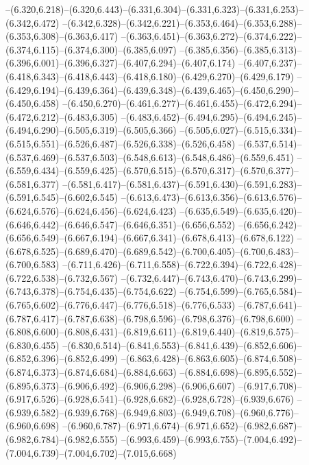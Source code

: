   --(6.320,6.218)--(6.320,6.443)--(6.331,6.304)--(6.331,6.323)--(6.331,6.253)--(6.342,6.472)%
  --(6.342,6.328)--(6.342,6.221)--(6.353,6.464)--(6.353,6.288)--(6.353,6.308)--(6.363,6.417)%
  --(6.363,6.451)--(6.363,6.272)--(6.374,6.222)--(6.374,6.115)--(6.374,6.300)--(6.385,6.097)%
  --(6.385,6.356)--(6.385,6.313)--(6.396,6.001)--(6.396,6.327)--(6.407,6.294)--(6.407,6.174)%
  --(6.407,6.237)--(6.418,6.343)--(6.418,6.443)--(6.418,6.180)--(6.429,6.270)--(6.429,6.179)%
  --(6.429,6.194)--(6.439,6.364)--(6.439,6.348)--(6.439,6.465)--(6.450,6.290)--(6.450,6.458)%
  --(6.450,6.270)--(6.461,6.277)--(6.461,6.455)--(6.472,6.294)--(6.472,6.212)--(6.483,6.305)%
  --(6.483,6.452)--(6.494,6.295)--(6.494,6.245)--(6.494,6.290)--(6.505,6.319)--(6.505,6.366)%
  --(6.505,6.027)--(6.515,6.334)--(6.515,6.551)--(6.526,6.487)--(6.526,6.338)--(6.526,6.458)%
  --(6.537,6.514)--(6.537,6.469)--(6.537,6.503)--(6.548,6.613)--(6.548,6.486)--(6.559,6.451)%
  --(6.559,6.434)--(6.559,6.425)--(6.570,6.515)--(6.570,6.317)--(6.570,6.377)--(6.581,6.377)%
  --(6.581,6.417)--(6.581,6.437)--(6.591,6.430)--(6.591,6.283)--(6.591,6.545)--(6.602,6.545)%
  --(6.613,6.473)--(6.613,6.356)--(6.613,6.576)--(6.624,6.576)--(6.624,6.456)--(6.624,6.423)%
  --(6.635,6.549)--(6.635,6.420)--(6.646,6.442)--(6.646,6.547)--(6.646,6.351)--(6.656,6.552)%
  --(6.656,6.242)--(6.656,6.549)--(6.667,6.194)--(6.667,6.341)--(6.678,6.413)--(6.678,6.122)%
  --(6.678,6.525)--(6.689,6.470)--(6.689,6.542)--(6.700,6.405)--(6.700,6.483)--(6.700,6.583)%
  --(6.711,6.426)--(6.711,6.558)--(6.722,6.394)--(6.722,6.428)--(6.722,6.538)--(6.732,6.567)%
  --(6.732,6.447)--(6.743,6.470)--(6.743,6.299)--(6.743,6.378)--(6.754,6.435)--(6.754,6.622)%
  --(6.754,6.599)--(6.765,6.584)--(6.765,6.602)--(6.776,6.447)--(6.776,6.518)--(6.776,6.533)%
  --(6.787,6.641)--(6.787,6.417)--(6.787,6.638)--(6.798,6.596)--(6.798,6.376)--(6.798,6.600)%
  --(6.808,6.600)--(6.808,6.431)--(6.819,6.611)--(6.819,6.440)--(6.819,6.575)--(6.830,6.455)%
  --(6.830,6.514)--(6.841,6.553)--(6.841,6.439)--(6.852,6.606)--(6.852,6.396)--(6.852,6.499)%
  --(6.863,6.428)--(6.863,6.605)--(6.874,6.508)--(6.874,6.373)--(6.874,6.684)--(6.884,6.663)%
  --(6.884,6.698)--(6.895,6.552)--(6.895,6.373)--(6.906,6.492)--(6.906,6.298)--(6.906,6.607)%
  --(6.917,6.708)--(6.917,6.526)--(6.928,6.541)--(6.928,6.682)--(6.928,6.728)--(6.939,6.676)%
  --(6.939,6.582)--(6.939,6.768)--(6.949,6.803)--(6.949,6.708)--(6.960,6.776)--(6.960,6.698)%
  --(6.960,6.787)--(6.971,6.674)--(6.971,6.652)--(6.982,6.687)--(6.982,6.784)--(6.982,6.555)%
  --(6.993,6.459)--(6.993,6.755)--(7.004,6.492)--(7.004,6.739)--(7.004,6.702)--(7.015,6.668)%
